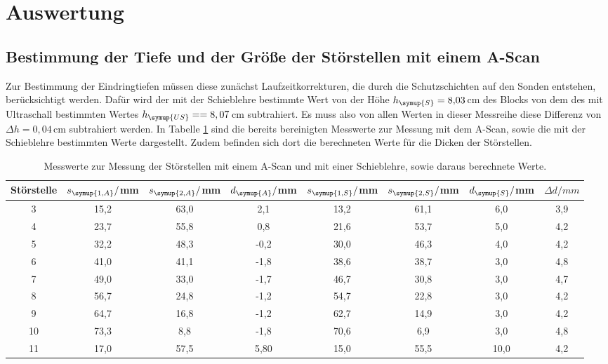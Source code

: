 \section{Auswertung}
\label{sec:Auswertung}

\subsection{Bestimmung der Tiefe und der Größe der Störstellen mit einem A-Scan}
\label{subsec:A_scan_störstellen}

Zur Bestimmung der Eindringtiefen müssen diese zunächst Laufzeitkorrekturen, die durch
die Schutzschichten auf den Sonden entstehen, berücksichtigt werden. Dafür wird der
mit der Schieblehre bestimmte Wert von der Höhe $h_{\symup{S}}=8{,}03\,$cm des Blocks
von dem des mit Ultraschall bestimmten Wertes $h_{\symup{US}}==8,07\,$cm subtrahiert.
Es muss also von allen Werten in dieser Messreihe diese Differenz von $\Delta h=0{,}04\,$cm
subtrahiert werden. In Tabelle \ref{tab:messwerte} sind die  bereits bereinigten
Messwerte zur Messung mit dem A-Scan, sowie die mit der Schieblehre bestimmten
Werte dargestellt. Zudem befinden sich dort die berechneten Werte für die Dicken
der Störstellen.

\begin{table}[htp]
	\begin{center}
    \label{tab:messwerte}
    \caption{Messwerte zur Messung der Störstellen mit einem A-Scan und mit einer Schieblehre,
    sowie daraus berechnete Werte.}
		\begin{tabular}{cccccccc}
		\toprule
			{Störstelle} & {$s_{\symup{1,A}}/$mm} & {$s_{\symup{2,A}}/$mm} & {$d_{\symup{A}}/$mm} &
      {$s_{\symup{1,S}}/$mm} & {$s_{\symup{2,S}}/$mm} & {$d_{\symup{S}}/$mm} & {$\Delta d/mm$}\\
			\midrule
			3   & 15,2 & 63,0 & 2,1 & 13,2 & 61,1 & 6,0 & 3,9\\
			4   & 23,7 & 55,8 & 0,8 & 21,6 & 53,7 & 5,0 & 4,2\\
			5   & 32,2 & 48,3 & -0,2 & 30,0 & 46,3 & 4,0 & 4,2\\
			6   & 41,0 & 41,1 & -1,8 & 38,6 & 38,7 & 3,0 & 4,8\\
			7   & 49,0 & 33,0 & -1,7 & 46,7 & 30,8 & 3,0 & 4,7\\
			8   & 56,7 & 24,8 & -1,2 & 54,7 & 22,8 & 3,0 & 4,2\\
			9   & 64,7 & 16,8 & -1,2 & 62,7 & 14,9 & 3,0 & 4,2\\
			10  & 73,3 & 8,8  & -1,8 & 70,6 & 6,9 & 3,0 & 4,8\\
			11  & 17,0 & 57,5 & 5,80 & 15,0 & 55,5 & 10,0 & 4,2\\
		\bottomrule
		\end{tabular}
	\end{center}
\end{table}

